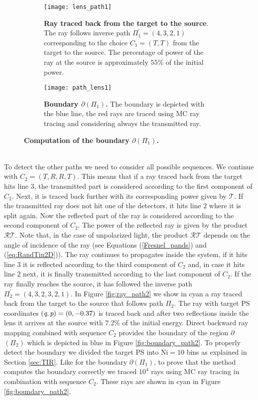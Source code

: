 \begin{figure}[t]
\centering
\begin{subfigure}[t]{.45\textwidth}
  \texttt{[image: lens\_path1]}
 \caption{\textbf{Ray traced back from the target to the source}. The ray follows inverse path $\Pi_1^{\prime} = (4,3,2,1)$ corresponding to the choice $C_1=(T,T)$ from the target to the source. The percentage of power of the ray at the source is approximately $55\%$ of the initial power.}
  \label{fig:ray_path1}
\end{subfigure}%
\hfill
\begin{subfigure}[t]{.45\textwidth}
  \texttt{[image: path\_lens1]}
  \caption{\textbf{Boundary $\partial$$(\Pi_1)$.} The boundary is depicted with the blue line, the red rays are traced using MC ray tracing and considering always the transmitted ray.} %
  \label{fig:boundary_path1}
\end{subfigure} %
\caption{\textbf{Computation of the boundary $\partial$$(\Pi_1)$.}}
\end{figure}
\\ \indent To detect the other paths we need to consider all possible sequences. We continue with $C_2 = (T, R, R, T)$. This means that if a ray traced back from the target hits line $3$, the transmitted part is considered according to the first component of $C_2$. Next, it is traced back further with its corresponding power given by $\mathcal{T}$. If the transmitted ray does not hit one of the detectors, it hits line $2$ where it is split again. Now the reflected part of the ray is considered according to the second component of $C_2$. The power of the reflected ray is given by the product $\mathcal{R}\mathcal{T}$. Note that, in the case of unpolarized light, the product $\mathcal{R}\mathcal{T}$ depends on the angle of incidence of the ray (see Equations (\ref{Fresnel_pands}) and (\ref{eq:RandTin2D})). The ray continues to propagates inside the system, if it hits line $3$ it is reflected according to the third component of $C_2$ and, in case it hits line $2$ next, it is finally transmitted according to the last component of $C_2$. If the ray finally reaches the source, it has followed the inverse path $\Pi_2^{\prime} = (4,3,2,3,2,1)$. 
In Figure \ref{fig:ray_path2} we show in cyan a ray traced back from the target to the source that follows path $\Pi_2$. The ray with target PS coordinates $(\textit{q}, \textit{p})=(0,-0.37)$ is traced back and after two reflections inside the lens it arrives at the source with $7.2\%$ of the initial energy. Direct backward ray mapping combined with sequence $C_2$ provides the boundary of the region $\partial$$(\Pi_2)$ which is depicted in blue in Figure \ref{fig:boundary_path2}. To properly detect the boundary we divided the target PS into $\textrm{Ni}=10$ bins as explained in Section \ref{sec:TIR}. Like for the boundary $\partial$$(\Pi_1)$, to prove that the method computes the boundary correctly we traced $10^4$ rays using MC ray tracing in combination with sequence $C_2$. These rays are shown in cyan in Figure \ref{fig:boundary_path2}. 
